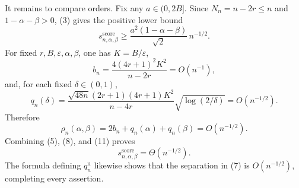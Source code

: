 It remains to compare orders.  Fix any \(a\in(0,2B]\).  Since \(N_n=n-2r\le n\) and \(1-\alpha-\beta>0\), (3) gives the positive lower bound
\[
 s_{n,\alpha,\beta}^{\mathrm{score}}
 \ge \frac{a^2(1-\alpha-\beta)}{\sqrt{2}}\,n^{-1/2}. \tag{8}
\]
For fixed \(r,B,\varepsilon,\alpha,\beta\), one has \(K=B/\varepsilon\),
\[
 b_n=\frac{4(4r+1)^2K^2}{n-2r}=O(n^{-1}), \tag{9}
\]
and, for each fixed \(\delta\in(0,1)\),
\[
 q_n(\delta)
 =\frac{\sqrt{48n}(2r+1)(4r+1)K^2}{n-4r}
   \sqrt{\log(2/\delta)}
 =O(n^{-1/2}). \tag{10}
\]
Therefore
\[
 \rho_n(\alpha,\beta)
 =2b_n+q_n(\alpha)+q_n(\beta)
 =O(n^{-1/2}). \tag{11}
\]
Combining (5), (8), and (11) proves
\[
 s_{n,\alpha,\beta}^{\mathrm{score}}=\Theta(n^{-1/2}). \tag{12}
\]
The formula defining \(q_n^{\mathrm u}\) likewise shows that the separation in (7) is \(O(n^{-1/2})\), completing every assertion.
